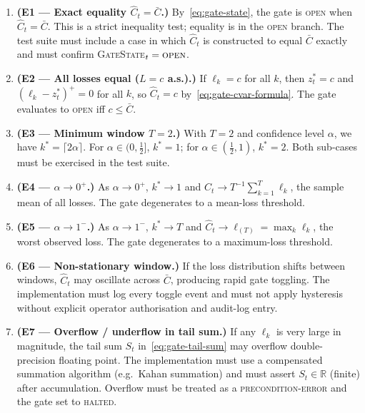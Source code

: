 \documentclass[12pt,openany]{book}
\numberwithin{equation}{chapter}
\theoremstyle{plain}
\theoremstyle{definition}
\theoremstyle{remark}
\numberwithin{equation}{chapter}
\theoremstyle{plain}
\begin{document}
\begin{enumerate}
  \item \textbf{(E1 --- Exact equality $\hat{C}_t = \bar{C}$.)}
        By~\eqref{eq:gate-state}, the gate is \textsc{open} when
        $\hat{C}_t = \bar{C}$.  This is a strict inequality test;
        equality is in the \textsc{open} branch.  The test suite
        must include a case in which $\hat{C}_t$ is constructed to
        equal $\bar{C}$ exactly and must confirm
        \textsc{GateState}$_t = \textsc{open}$.

  \item \textbf{(E2 --- All losses equal ($L = c$ a.s.).)}
        If $\ell_k = c$ for all $k$, then
        $z^*_t = c$ and $({\ell_k - z^*_t})^+ = 0$ for all $k$,
        so $\hat{C}_t = c$ by~\eqref{eq:gate-cvar-formula}.
        The gate evaluates to \textsc{open} iff $c \leq \bar{C}$.

  \item \textbf{(E3 --- Minimum window $T = 2$.)}
        With $T = 2$ and confidence level $\alpha$, we have
        $k^* = \lceil 2\alpha \rceil$.  For $\alpha \in (0, \tfrac{1}{2}]$,
        $k^* = 1$; for $\alpha \in (\tfrac{1}{2}, 1)$, $k^* = 2$.
        Both sub-cases must be exercised in the test suite.

  \item \textbf{(E4 --- $\alpha \to 0^+$.)}
        As $\alpha \to 0^+$, $k^* \to 1$ and
        $\hat{C}_t \to T^{-1}\sum_{k=1}^{T}\ell_k$,
        the sample mean of all losses.
        The gate degenerates to a mean-loss threshold.

  \item \textbf{(E5 --- $\alpha \to 1^-$.)}
        As $\alpha \to 1^-$, $k^* \to T$ and
        $\hat{C}_t \to \ell_{(T)} = \max_k \ell_k$,
        the worst observed loss.
        The gate degenerates to a maximum-loss threshold.

  \item \textbf{(E6 --- Non-stationary window.)}
        If the loss distribution shifts between windows,
        $\hat{C}_t$ may oscillate across $\bar{C}$, producing
        rapid gate toggling.  The implementation must log every
        toggle event and must not apply hysteresis without
        explicit operator authorisation and audit-log entry.

  \item \textbf{(E7 --- Overflow / underflow in tail sum.)}
        If any $\ell_k$ is very large in magnitude, the tail
        sum $S_t$ in~\eqref{eq:gate-tail-sum} may overflow
        double-precision floating point.  The implementation must
        use a compensated summation algorithm (e.g.\
        Kahan summation) and must assert
        $S_t \in \mathbb{R}$ (finite) after accumulation.
        Overflow must be treated as a \textsc{precondition-error}
        and the gate set to \textsc{halted}.
\end{enumerate}
\end{document}
